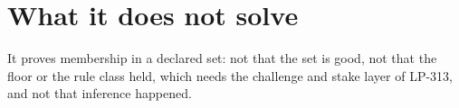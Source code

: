 \documentclass[10pt,a4paper]{article}
\begin{document}
\section*{What it does not solve}

It proves membership in a declared set: not that the set is good, not that the floor or the rule
class held, which needs the challenge and stake layer of LP-313, and not that inference happened.

\vspace{0.6ex}
\end{document}
